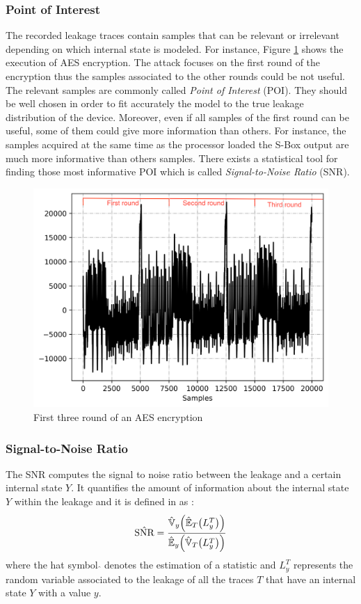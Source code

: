 \subsubsection{Point of Interest}
The recorded leakage traces contain samples that can be relevant or 
irrelevant depending on which internal state is modeled. For instance, 
Figure \ref{fig:trace recorded} shows the execution of AES encryption. The 
attack focuses on the first round of the encryption thus the samples 
associated to the other rounds could be not useful. The relevant samples 
are commonly called \textit{Point of Interest} (POI). They should be well 
chosen in order to fit accurately the model to the true leakage 
distribution of the device. Moreover, even if all samples of the first 
round can be useful, some of them could give more information than others. 
For instance, the samples acquired at the same time as the processor 
loaded the S-Box output are much more informative than others samples. 
There exists a statistical tool for finding those most informative POI 
which is called \textit{Signal-to-Noise Ratio} (SNR).
\begin{figure}[h]
    \centering
    \includegraphics[width=0.5\columnwidth]{Images/Trace recording.png}
    \caption{First three round of an AES encryption}
    \label{fig:trace recorded}
\end{figure}
\subsubsection{Signal-to-Noise Ratio}
The SNR computes the signal to noise ratio between the leakage and a 
certain internal state $Y$. It quantifies the amount of information about 
the internal state $Y$ within the leakage and it is defined in 
\cite{Mangard} as :
\begin{equation*}
    \hat{\text{SNR}} = 
\frac{\hat{\mathbb{V}}_y\Bigl(\hat{\mathbb{E}}_T\bigl(L_y^T\bigr)\Bigr)}{\hat{\mathbb{E}}_y\Bigl(\hat{\mathbb{V}}_T\bigl(L_y^T\bigr)\Bigr)}
\end{equation*}
where the hat symbol $\hat{}$ denotes the estimation of a statistic and 
$L^T_y$ represents the random variable associated to the leakage of all 
the traces $T$ that have an internal state $Y$ with a value $y$. \\


